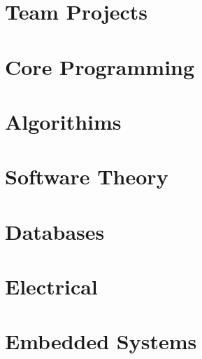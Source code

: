 \section{Team Projects}
\hypertarget{cat:team}{}
\newpage











\section{Core Programming}
\hypertarget{cat:programming}{}




\section{Algorithims}
\hypertarget{cat:algo}{}



\section{Software Theory}
\hypertarget{cat:theory}{}



\section{Databases}
\hypertarget{cat:database}{}





\section{Electrical}
\hypertarget{cat:elec}{}


\section{Embedded Systems}
\hypertarget{cat:embedded}{}





